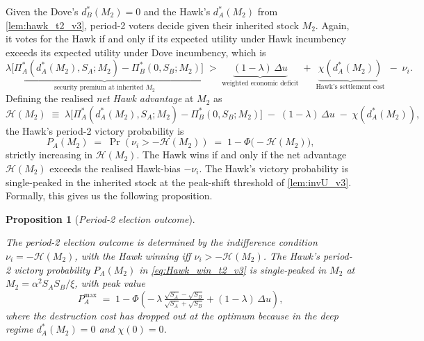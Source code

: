 \documentclass[11pt,twoside]{extarticle}
\newtheorem{proposition}{Proposition}
\begin{document}
Given the Dove's $d_B^*(M_2)=0$ and the Hawk's $d_A^*(M_2)$ from \autoref{lem:hawk_t2_v3}, period-2 voters decide given their inherited stock $M_2$. Again, it votes for the Hawk if and only if its expected utility under Hawk incumbency exceeds its expected utility under Dove incumbency, which is
\begin{equation}\label{eq:vote_HA_v3}
    \underbrace{\lambda\big[\Pi_A^*(d_A^*(M_2),S_A;M_2)-\Pi_B^*(0,S_B;M_2)\big]}_{\text{security premium at inherited }M_2}\;>\;\underbrace{(1-\lambda)\,\Delta u}_{\text{weighted economic deficit}}\;+\;\underbrace{\chi(d_A^*(M_2))}_{\text{Hawk's settlement cost}}\;-\;\nu_i.
\end{equation}
Defining the realised \emph{net Hawk advantage} at $M_2$ as
\begin{equation}\label{eq:net_advantage_v3}
    \mathcal H(M_2)\;\equiv\;\lambda\big[\Pi_A^*(d_A^*(M_2),S_A;M_2)-\Pi_B^*(0,S_B;M_2)\big]\;-\;(1-\lambda)\,\Delta u\;-\;\chi(d_A^*(M_2)),
\end{equation}
the Hawk's period-2 victory probability is
\begin{equation}\label{eq:Hawk_win_t2_v3}
    P_A(M_2)\;=\;\Pr(\nu_i>-\mathcal H(M_2))\;=\;1-\Phi\big(-\mathcal H(M_2)\big),
\end{equation}
strictly increasing in $\mathcal H(M_2)$. 
The Hawk wins if and only if the net advantage $\mathcal H(M_2)$ exceeds the realised Hawk-bias $-\nu_i$. The Hawk's victory probability is single-peaked in the inherited stock at the peak-shift threshold of \autoref{lem:invU_v3}. Formally, this gives us the following proposition.

\begin{proposition}[\emph{Period-2 election outcome}]\label{prop:t2_election_v3}

The period-2 election outcome is determined by the indifference condition $\nu_i=-\mathcal H(M_2)$, with the Hawk winning iff $\nu_i>-\mathcal H(M_2)$. The Hawk's period-2 victory probability $P_A(M_2)$ in \eqref{eq:Hawk_win_t2_v3} is single-peaked in $M_2$ at $M_2=\alpha^2 S_A S_B/\xi$, with peak value
\begin{equation}\label{eq:P_A_max_v3}
    P_A^{\max}\;=\;1-\Phi\!\left(-\,\lambda\,\tfrac{\sqrt{S_A}-\sqrt{S_B}}{\sqrt{S_A}+\sqrt{S_B}}+(1-\lambda)\,\Delta u\right),
\end{equation}
where the destruction cost has dropped out at the optimum because in the deep regime $d_A^*(M_2)=0$ and $\chi(0)=0$.
\end{proposition}
\end{document}
